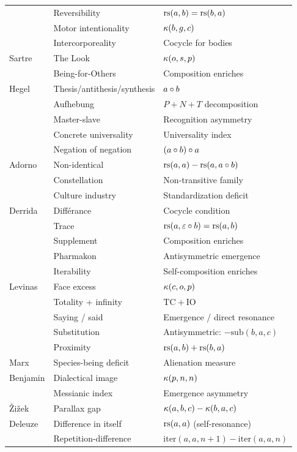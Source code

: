 \begin{center}
\begin{tabular}{lll}
& Reversibility & $\mathrm{rs}(a,b) = \mathrm{rs}(b,a)$ \\
& Motor intentionality & $\kappa(b, g, c)$ \\
& Intercorporeality & Cocycle for bodies \\
\hline
Sartre & The Look & $\kappa(o, s, p)$ \\
& Being-for-Others & Composition enriches \\
\hline
Hegel & Thesis/antithesis/synthesis & $a \circ b$ \\
& Aufhebung & $P + N + T$ decomposition \\
& Master-slave & Recognition asymmetry \\
& Concrete universality & Universality index \\
& Negation of negation & $(a \circ b) \circ a$ \\
\hline
Adorno & Non-identical & $\mathrm{rs}(a,a) - \mathrm{rs}(a, a \circ b)$ \\
& Constellation & Non-transitive family \\
& Culture industry & Standardization deficit \\
\hline
Derrida & Diff\'erance & Cocycle condition \\
& Trace & $\mathrm{rs}(a, \varepsilon \circ b) = \mathrm{rs}(a, b)$ \\
& Supplement & Composition enriches \\
& Pharmakon & Antisymmetric emergence \\
& Iterability & Self-composition enriches \\
\hline
Levinas & Face excess & $\kappa(c, o, p)$ \\
& Totality + infinity & $\mathrm{TC} + \mathrm{IO}$ \\
& Saying / said & Emergence / direct resonance \\
& Substitution & Antisymmetric: $-\mathrm{sub}(b,a,c)$ \\
& Proximity & $\mathrm{rs}(a,b) + \mathrm{rs}(b,a)$ \\
\hline
Marx & Species-being deficit & Alienation measure \\
Benjamin & Dialectical image & $\kappa(p, n, n)$ \\
& Messianic index & Emergence asymmetry \\
\v{Z}i\v{z}ek & Parallax gap & $\kappa(a,b,c) - \kappa(b,a,c)$ \\
\hline
Deleuze & Difference in itself & $\mathrm{rs}(a, a)$ (self-resonance) \\
& Repetition-difference & $\mathrm{iter}(a, a, n+1) - \mathrm{iter}(a, a, n)$ \\

\end{tabular}
\end{center}
